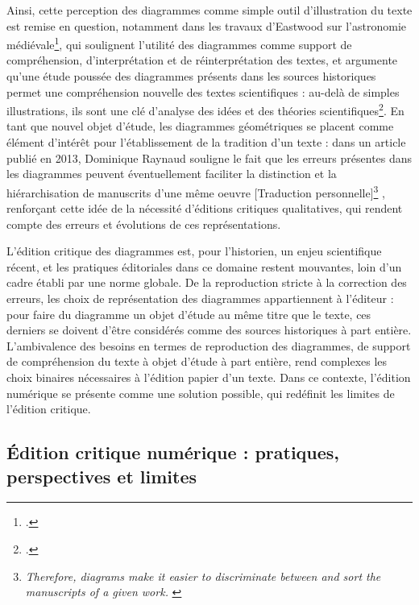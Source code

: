 Ainsi, cette perception des diagrammes comme simple outil d'illustration du texte est remise en question, notamment dans les travaux d'Eastwood sur l'astronomie médiévale\footcite{eastwoodPlanetaryDiagramsRoman2004}, qui soulignent l'utilité des diagrammes comme support de compréhension, d'interprétation et de réinterprétation des textes, et argumente qu'une étude poussée des diagrammes présents dans les sources historiques permet une compréhension nouvelle des textes scientifiques : au-delà de simples illustrations, ils sont une clé d'analyse des idées et des théories scientifiques\footcite{jardineCriticalEditingEarlyModern2010}. En tant que nouvel objet d'étude, les diagrammes géométriques se placent comme élément d'intérêt pour l'établissement de la tradition d'un texte : dans un article publié en 2013, Dominique Raynaud souligne le fait que les erreurs présentes dans les diagrammes peuvent éventuellement \og faciliter la distinction et la hiérarchisation de manuscrits d'une même oeuvre [Traduction personnelle]\footnote{\textit{\og Therefore, diagrams make it easier to discriminate between and sort the manuscripts of a given work. \fg}\cite{raynaudBuildingStemmaCodicum2014}} \fg , renforçant cette idée de la nécessité d'éditions critiques qualitatives, qui rendent compte des erreurs et évolutions de ces représentations.

L'édition critique des diagrammes est, pour l'historien, un enjeu scientifique récent, et les pratiques éditoriales dans ce domaine restent mouvantes, loin d'un cadre établi par une norme globale. De la reproduction stricte à la correction des erreurs, les choix de représentation des diagrammes appartiennent à l'éditeur : pour faire du diagramme un objet d'étude au même titre que le texte, ces derniers se doivent d'être considérés comme des sources historiques à part entière. L'ambivalence des besoins en termes de reproduction des diagrammes, de support de compréhension du texte à objet d'étude à part entière, rend complexes les choix binaires nécessaires à l'édition papier d'un texte. Dans ce contexte, l'édition numérique se présente comme une solution possible, qui redéfinit les limites de l'édition critique.
    
\subsection{Édition critique numérique : pratiques, perspectives et limites}
